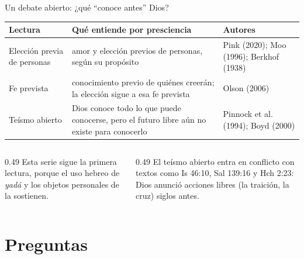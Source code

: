 \begin{frame}{Un debate abierto: ¿qué ``conoce antes'' Dios?}
\scriptsize\renewcommand{\arraystretch}{1.2}
\begin{tabular}{@{}>{\RaggedRight\arraybackslash}p{2.6cm}>{\RaggedRight\arraybackslash}p{5.5cm}>{\RaggedRight\arraybackslash}p{3.7cm}@{}}
\toprule
\textbf{Lectura} & \textbf{Qué entiende por presciencia} & \textbf{Autores} \\ \midrule
Elección previa de personas & amor y elección previos de personas, según su propósito & Pink (2020); Moo (1996); Berkhof (1938) \\
Fe prevista & conocimiento previo de quiénes creerán; la elección sigue a esa fe prevista & Olson (2006) \\
Teísmo abierto & Dios conoce todo lo que puede conocerse, pero el futuro libre aún no existe para conocerlo & Pinnock et al. (1994); Boyd (2000) \\
\bottomrule
\end{tabular}\par\medskip
\begin{columns}[t,onlytextwidth]
\begin{column}{0.49\textwidth}\small
Esta serie sigue la primera lectura, porque el uso hebreo de \emph{yadá} y los objetos personales de  la sostienen.
\end{column}
\begin{column}{0.49\textwidth}\scriptsize
El teísmo abierto entra en conflicto con textos como Is 46:10, Sal 139:16 y Hch 2:23: Dios anunció acciones libres (la traición, la cruz) siglos antes.\par\smallskip
{}
\end{column}
\end{columns}
\end{frame}

\section{Preguntas}


